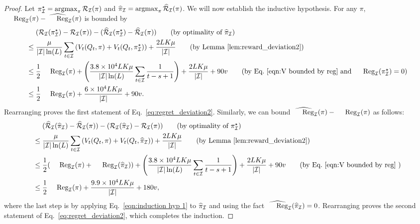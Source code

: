 \begin{proof}
Let $\pi_{\mathcal{I}}^\star = \operatorname*{argmax}_{\pi} {\mathcal{R}}_{\mathcal{I}}(\pi)$ and
$\widehat{\pi}_{\mathcal{I}} = \operatorname*{argmax}_{\pi} \widehat{\cal{R}}_{\mathcal{I}}(\pi)$. We will now establish
the inductive hypothesis. For any $\pi$, $\Reg_\calI(\pi) -
\whReg_{\calI}(\pi)$ is bounded by
%
\begin{align}
&(\calR_\calI(\pi_\calI^\star) - \calR_\calI(\pi)) - (\avgR_\calI(\pi_\calI^\star) - \avgR_\calI(\pi)) \tag{by optimality of $\whpi_\calI$} \\
\leq\;& \frac{\mu}{|\calI|\ln(L)} \sum_{t\in\calI}\left( V_t(Q_t, \pi) + V_t(Q_t, \pi_\calI^\star) \right) + \frac{2LK\mu}{|\calI|} \tag{by Lemma~\ref{lem:reward_deviation2}} \\
\leq\;& \frac{1}{2}\Reg_\calI(\pi) + \left(\frac{3.8\times 10^4 LK\mu}{|\calI|\ln(L)}\sum_{t\in \calI} \frac{1}{t-s+1}\right) + \frac{2LK\mu}{|\calI|} + 90v
   \tag{by Eq.~\eqref{eqn:V bounded by reg} and $\Reg_\calI(\pi_\calI^\star) = 0$} \\
\leq\;& \frac{1}{2}\Reg_{\calI}(\pi)  + \frac{6\times 10^4LK\mu}{|\calI|} + 90v. \label{eqn:induction hyp 1}
\end{align}
%
Rearranging proves the first
statement of Eq.~\eqref{eq:regret_deviation2}.  Similarly, we can bound
$\whReg_{\calI}(\pi) - \Reg_\calI(\pi)$ as follows:
%
\begin{align}
&(\avgR_\calI(\whpi_\calI) - \avgR_\calI(\pi)) - (\calR_\calI(\whpi_\calI) - \calR_\calI(\pi))   \tag{by optimality of $\pi_\calI^\star$} \\
\leq\;& \frac{\mu}{|\calI|\ln(L)} \sum_{t\in\calI}\left( V_t(Q_t, \pi) + V_t(Q_t, \whpi_\calI) \right) + \frac{2LK\mu}{|\calI|} \tag{by Lemma~\ref{lem:reward_deviation2}} \\
\leq\;& \frac{1}{2}(\Reg_\calI(\pi) + \Reg_\calI(\whpi_\calI)) + \left(\frac{3.8\times 10^4 LK\mu}{|\calI|\ln(L)}\sum_{t\in \calI} \frac{1}{t-s+1}\right) + \frac{2LK\mu}{|\calI|} + 90v
   \tag{by Eq.~\eqref{eqn:V bounded by reg} } \\
\leq\;& \frac{1}{2}\Reg_{\calI}(\pi)  + \frac{9.9\times 10^4 LK\mu}{|\calI|} + 180v,
\end{align}
%
where the last step is by applying Eq.~\eqref{eqn:induction hyp 1} to
$\widehat{\pi}_{\mathcal{I}}$ and using the fact $\whReg_\calI(\whpi_\calI) = 0$.
Rearranging proves the second
statement of Eq.~\eqref{eq:regret_deviation2}, which completes the
induction.
\end{proof}

